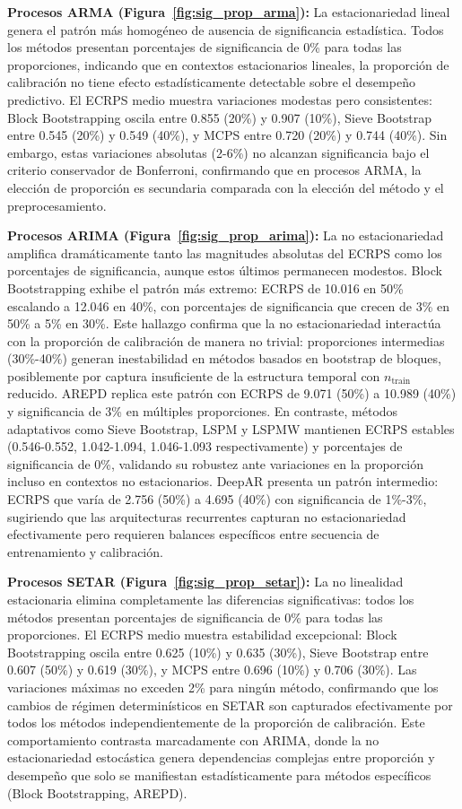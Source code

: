 \textbf{Procesos ARMA (Figura~\ref{fig:sig_prop_arma}):} La estacionariedad lineal genera el patrón más homogéneo de ausencia de significancia estadística. Todos los métodos presentan porcentajes de significancia de 0\% para todas las proporciones, indicando que en contextos estacionarios lineales, la proporción de calibración no tiene efecto estadísticamente detectable sobre el desempeño predictivo. El ECRPS medio muestra variaciones modestas pero consistentes: Block Bootstrapping oscila entre 0.855 (20\%) y 0.907 (10\%), Sieve Bootstrap entre 0.545 (20\%) y 0.549 (40\%), y MCPS entre 0.720 (20\%) y 0.744 (40\%). Sin embargo, estas variaciones absolutas (2-6\%) no alcanzan significancia bajo el criterio conservador de Bonferroni, confirmando que en procesos ARMA, la elección de proporción es secundaria comparada con la elección del método y el preprocesamiento.

\textbf{Procesos ARIMA (Figura~\ref{fig:sig_prop_arima}):} La no estacionariedad amplifica dramáticamente tanto las magnitudes absolutas del ECRPS como los porcentajes de significancia, aunque estos últimos permanecen modestos. Block Bootstrapping exhibe el patrón más extremo: ECRPS de 10.016 en 50\% escalando a 12.046 en 40\%, con porcentajes de significancia que crecen de 3\% en 50\% a 5\% en 30\%. Este hallazgo confirma que la no estacionariedad interactúa con la proporción de calibración de manera no trivial: proporciones intermedias (30\%-40\%) generan inestabilidad en métodos basados en bootstrap de bloques, posiblemente por captura insuficiente de la estructura temporal con $n_{\text{train}}$ reducido. AREPD replica este patrón con ECRPS de 9.071 (50\%) a 10.989 (40\%) y significancia de 3\% en múltiples proporciones. En contraste, métodos adaptativos como Sieve Bootstrap, LSPM y LSPMW mantienen ECRPS estables (0.546-0.552, 1.042-1.094, 1.046-1.093 respectivamente) y porcentajes de significancia de 0\%, validando su robustez ante variaciones en la proporción incluso en contextos no estacionarios. DeepAR presenta un patrón intermedio: ECRPS que varía de 2.756 (50\%) a 4.695 (40\%) con significancia de 1\%-3\%, sugiriendo que las arquitecturas recurrentes capturan no estacionariedad efectivamente pero requieren balances específicos entre secuencia de entrenamiento y calibración.

\textbf{Procesos SETAR (Figura~\ref{fig:sig_prop_setar}):} La no linealidad estacionaria elimina completamente las diferencias significativas: todos los métodos presentan porcentajes de significancia de 0\% para todas las proporciones. El ECRPS medio muestra estabilidad excepcional: Block Bootstrapping oscila entre 0.625 (10\%) y 0.635 (30\%), Sieve Bootstrap entre 0.607 (50\%) y 0.619 (30\%), y MCPS entre 0.696 (10\%) y 0.706 (30\%). Las variaciones máximas no exceden 2\% para ningún método, confirmando que los cambios de régimen determinísticos en SETAR son capturados efectivamente por todos los métodos independientemente de la proporción de calibración. Este comportamiento contrasta marcadamente con ARIMA, donde la no estacionariedad estocástica genera dependencias complejas entre proporción y desempeño que solo se manifiestan estadísticamente para métodos específicos (Block Bootstrapping, AREPD).

